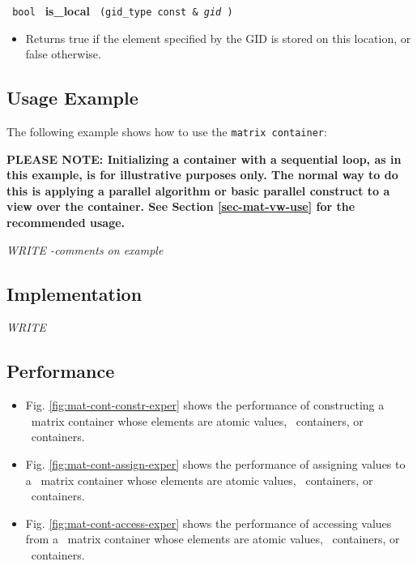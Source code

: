 \noindent
\texttt{%
bool
}
\textbf{is\_local}%
\texttt{%
(gid\_type const \&
\textit{gid}%
)
}

\begin{itemize}
\item
Returns true if the element specified by the GID is stored on this location, or false otherwise. 
\end{itemize}

\subsection{Usage Example} \label{sec-mat-cont-use}

The following example shows how to use the \texttt{matrix container}:


\textbf{PLEASE NOTE: 
Initializing a container with a sequential loop, as in this example,
is for illustrative purposes only.
The normal way to do this is applying a parallel algorithm or 
basic parallel construct to a view over the container.  See Section
\ref{sec-mat-vw-use}
for the recommended usage.
}

\vspace{0.4cm} \textit{WRITE -comments on example}

\subsection{Implementation} \label{sec-mat-cont-impl}

\textit{WRITE}

\subsection{Performance} \label{sec-mat-cont-perf}

\begin{itemize}
\item
Fig. \ref{fig:mat-cont-constr-exper}
shows the performance of constructing a \stapl\ matrix container
whose elements are atomic values, \stl\ containers, or \stapl\ containers.
\item
Fig. \ref{fig:mat-cont-assign-exper}
shows the performance of assigning values to a \stapl\ matrix container
whose elements are atomic values, \stl\ containers, or \stapl\ containers.
\item
Fig. \ref{fig:mat-cont-access-exper}
shows the performance of accessing values from a \stapl\ matrix container
whose elements are atomic values, \stl\ containers, or \stapl\ containers.
\end{itemize}


